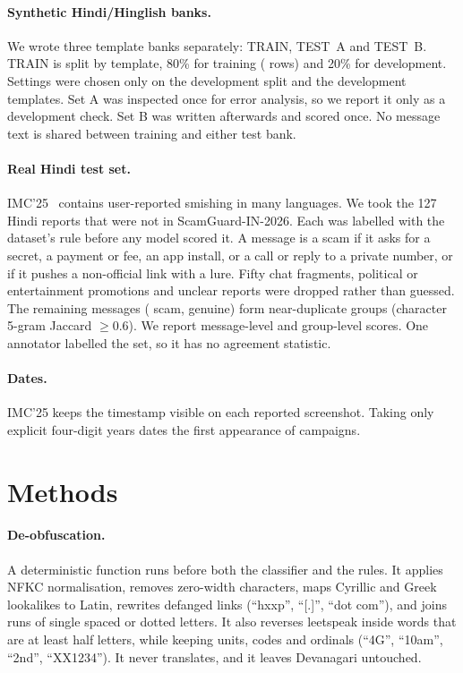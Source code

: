 \documentclass[10pt,twocolumn]{article}
\begin{document}
\paragraph{Synthetic Hindi/Hinglish banks.} We wrote three template banks separately: TRAIN, TEST~A and TEST~B. TRAIN
is split by template, 80\% for training (\nHinTrain{} rows) and 20\% for development. Settings were chosen only on the
development split and the development templates. Set A was inspected once for error analysis, so we report it only
as a development check. Set B was written afterwards and scored once. No message text is shared between training and
either test bank.

\paragraph{Real Hindi test set.} IMC'25~\cite{imc25} contains user-reported smishing in many languages. We took the
127 Hindi reports that were not in ScamGuard-IN-2026. Each was labelled with the dataset's rule before any model
scored it. A message is a scam if it asks for a secret, a payment or fee, an app install, or a call or reply to a
private number, or if it pushes a non-official link with a lure. Fifty chat fragments, political or entertainment
promotions and unclear reports were dropped rather than guessed. The remaining \nRH{} messages (\nRHScam{} scam,
\nRHGen{} genuine) form \nRHGroups{} near-duplicate groups (character 5-gram Jaccard $\ge 0.6$). We report
message-level and group-level scores. One annotator labelled the set, so it has no agreement statistic.

\paragraph{Dates.} IMC'25 keeps the timestamp visible on each reported screenshot. Taking only explicit four-digit
years dates the first appearance of \nDatedCamps{} campaigns.

\section{Methods}
\paragraph{De-obfuscation.} A deterministic function runs before both the classifier and the rules. It applies NFKC
normalisation, removes zero-width characters, maps Cyrillic and Greek lookalikes to Latin, rewrites defanged links
(``hxxp'', ``[.]'', ``dot com''), and joins runs of single spaced or dotted letters. It also reverses leetspeak
inside words that are at least half letters, while keeping units, codes and ordinals (``4G'', ``10am'', ``2nd'',
``XX1234''). It never translates, and it leaves Devanagari untouched.
\end{document}
